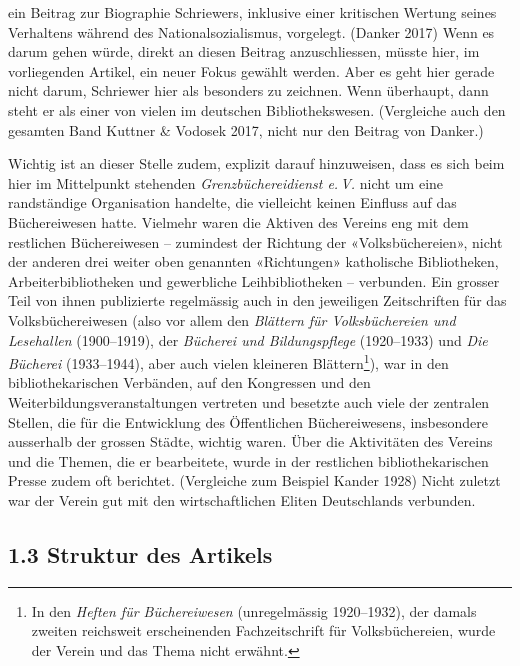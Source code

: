 \documentclass[a4paper,
fontsize=11pt,
oneside,
numbers=noperiodatend,
parskip=half-,
bibliography=totoc,
final
]{scrartcl}
\begin{document}
ein Beitrag zur Biographie Schriewers, inklusive einer kritischen
Wertung seines Verhaltens während des Nationalsozialismus, vorgelegt.
(Danker 2017) Wenn es darum gehen würde, direkt an diesen Beitrag
anzuschliessen, müsste hier, im vorliegenden Artikel, ein neuer Fokus
gewählt werden. Aber es geht hier gerade nicht darum, Schriewer hier als
besonders zu zeichnen. Wenn überhaupt, dann steht er als einer von
vielen im deutschen Bibliothekswesen. (Vergleiche auch den gesamten Band
Kuttner \& Vodosek 2017, nicht nur den Beitrag von Danker.)

Wichtig ist an dieser Stelle zudem, explizit darauf hinzuweisen, dass es
sich beim hier im Mittelpunkt stehenden \emph{Grenzbüchereidienst e.\,V.}
nicht um eine randständige Organisation handelte, die vielleicht keinen
Einfluss auf das Büchereiwesen hatte. Vielmehr waren die Aktiven des
Vereins eng mit dem restlichen Büchereiwesen -- zumindest der Richtung
der «Volksbüchereien», nicht der anderen drei weiter oben genannten
«Richtungen» katholische Bibliotheken, Arbeiterbibliotheken und
gewerbliche Leihbibliotheken -- verbunden. Ein grosser Teil von ihnen
publizierte regelmässig auch in den jeweiligen Zeitschriften für das
Volksbüchereiwesen (also vor allem den \emph{Blättern für
Volksbüchereien und Lesehallen} (1900--1919), der \emph{Bücherei und
Bildungspflege} (1920--1933) und \emph{Die Bücherei} (1933--1944), aber
auch vielen kleineren Blättern\footnote{In den \emph{Heften für
  Büchereiwesen} (unregelmässig 1920--1932), der damals zweiten
  reichsweit erscheinenden Fachzeitschrift für Volksbüchereien, wurde
  der Verein und das Thema nicht erwähnt.}), war in den
bibliothekarischen Verbänden, auf den Kongressen und den
Weiterbildungsveranstaltungen vertreten und besetzte auch viele der
zentralen Stellen, die für die Entwicklung des Öffentlichen
Büchereiwesens, insbesondere ausserhalb der grossen Städte, wichtig
waren. Über die Aktivitäten des Vereins und die Themen, die er
bearbeitete, wurde in der restlichen bibliothekarischen Presse zudem oft
berichtet. (Vergleiche zum Beispiel Kander 1928) Nicht zuletzt war der
Verein gut mit den wirtschaftlichen Eliten Deutschlands verbunden.

\hypertarget{struktur-des-artikels}{%
\subsection{1.3 Struktur des Artikels}\label{struktur-des-artikels}}
\end{document}
